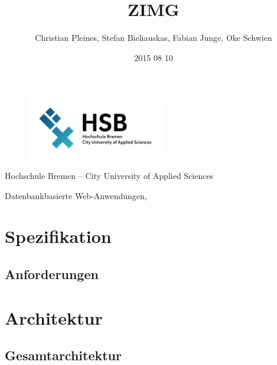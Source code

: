 \documentclass[12pt, oneside, a4paper]{article}		%
\title{ZIMG}
\author{Christian Pleines, Stefan Bieliauskas, Fabian Junge, Oke Schwien}
\date{2015 08 10}
\makeatletter
\renewcommand{\maketitle}{\bgroup\setlength{\parindent}{0pt}
	\begin{center}
		\vspace{4cm}
  		\seqsplit{\Huge{\textbf{\inserttitle}}}

  		\vspace{4cm}
  		\large{\insertauthor}

  		\vspace{2cm}
  		\small{Hochschule Bremen -- City University of Applied Sciences}

  		\small{Datenbankbasierte Web-Anwendungen, \insertdate}
	\end{center}\egroup
}
\let\inserttitle\@title
\let\insertauthor\@author
\let\insertdate\@date
\makeatother
\begin{document}
\begin{figure}[H]
	\centering
 	\includegraphics[width=6cm]{footage/Hochschule_Bremen_Logo_RGB} 
	\label{logoofhochschulebremengermany}
\end{figure}

\maketitle												%
\thispagestyle{empty}									%

\newpage

\tableofcontents

\newpage

\section{Spezifikation}
\blindtext

\subsection{Anforderungen}
\blindtext

\section{Architektur}
\blindtext

\subsection{Gesamtarchitektur}
\blindtext
\end{document}
